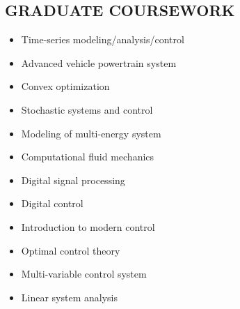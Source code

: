 \documentclass[margin, 9pt]{res}
\begin{document}
\begin{resume}
\section{GRADUATE COURSEWORK}

\vspace*{-5pt}
\begin{multicols}{2}
\begin{itemize}[leftmargin=*] \itemsep -2pt
   \item Time-series modeling/analysis/control
	\item Advanced vehicle powertrain system
    \item Convex optimization
    \item Stochastic systems and control
    \item Modeling of multi-energy system
    \item Computational fluid mechanics
    \item Digital signal processing
    \item Digital control
    \item Introduction to modern control
    \item Optimal control theory
    \item Multi-variable control system
    \item Linear system analysis
\end{itemize}
\end{multicols}


\end{resume}
\end{document}
